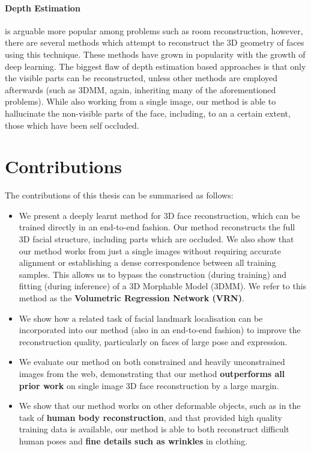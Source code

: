 \paragraph{Depth Estimation} is arguable more popular among problems
such as room reconstruction, however, there are several methods which
attempt to reconstruct the 3D geometry of faces using this
technique. These methods have grown in popularity with the growth of
deep learning. The biggest flaw of depth estimation based approaches
is that only the visible parts can be reconstructed, unless other
methods are employed afterwards (such as 3DMM, again, inheriting many
of the aforementioned problems). While also working from a single
image, our method is able to hallucinate the non-visible parts of the
face, including, to an a certain extent, those which have been self
occluded.



\section{Contributions}

The contributions of this thesis can be summarised as follows:

\begin{itemize}
\item %
  We present a deeply learnt method for 3D face reconstruction, which
  can be trained directly in an end-to-end fashion. Our method
  reconstructs the full 3D facial structure, including parts which are
  occluded. We also show that our method works from just a single
  images without requiring accurate alignment or establishing a dense
  correspondence between all training samples.  This allows us to
  bypass the construction (during training) and fitting (during
  inference) of a 3D Morphable Model (3DMM).  We refer to this method
  as the \textbf{Volumetric Regression Network (VRN)}.

\item %
  We show how a related task of facial landmark localisation can be
  incorporated into our method (also in an end-to-end fashion) to
  improve the reconstruction quality, particularly on faces of large
  pose and expression.

\item We evaluate our method on both constrained and heavily
  unconstrained images from the web, demonstrating that our method
  \textbf{outperforms all prior work} on single image 3D face
  reconstruction by a large margin.

\item We show that our method works on other deformable objects, such
  as in the task of \textbf{human body reconstruction}, and that
  provided high quality training data is available, our method is able
  to both reconstruct difficult human poses and \textbf{fine details
    such as wrinkles} in clothing.

\end{itemize}

